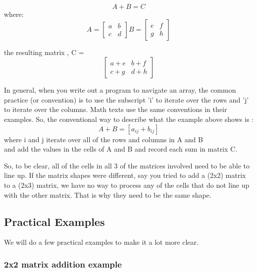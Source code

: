 \documentclass{article}
\begin{document}
\begin{equation*}
  A + B = C 
\end{equation*}
where: 
\[
A = \begin{bmatrix}
    a  &  b      \\
    c  &  d      
\end{bmatrix}
B = \begin{bmatrix}
    e  &  f      \\
    g  &  h      
\end{bmatrix} 
\]

the resulting matrix , C =  
\[
\begin{bmatrix}
    a+e  &  b+f      \\
    c+g  &  d+h      
\end{bmatrix}
\]

\vspace{2pc}

In general, when you write out a program to navigate an array, the common practice (or convention) is to use the subscript 'i' to iterate over the rows and 'j' to iterate over the columns. 
Math texts use the same conventions in their examples.
So, the conventional way to describe what the example above shows is :
\\
\begin{equation*}
  A + B = [a_{ij} + b_{ij}] 
\end{equation*}
where i and j iterate over all of the rows and columns in A and B
\\and add the values in the cells of A and B and record each sum in matrix C.

\vspace{2pc}

So, to be clear, all of the cells in all 3 of the matrices involved need to be able to line up.  If the matrix shapes were different, say you tried to add a (2x2) matrix to a (2x3) matrix, we have no way to process any of the cells that do not line up with the other matrix.  That is why they need to be the same shape.
\vspace{2pc}

\subsection{Practical Examples}
We will do a few practical examples to make it a lot more clear.

\subsubsection{2x2 matrix addition example}
\end{document}
